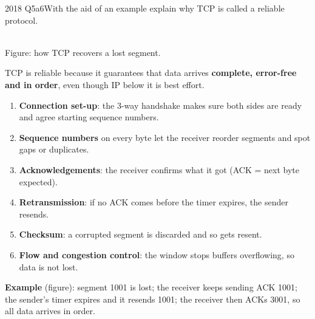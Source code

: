 \documentclass[10pt]{article}
\begin{document}
\begin{pastq}{2018 Q5a}{6}With the aid of an example explain why TCP is called a reliable protocol.\end{pastq}
\begin{center}
\\
{\scriptsize\color{midgrey}Figure: how TCP recovers a lost segment.}
\end{center}
\begin{ans}
TCP is reliable because it guarantees that data arrives \textbf{complete, error-free and in order}, even though IP below it is best effort.
\begin{enumerate}
\item \textbf{Connection set-up}: the 3-way handshake makes sure both sides are ready and agree starting sequence numbers.
\item \textbf{Sequence numbers} on every byte let the receiver reorder segments and spot gaps or duplicates.
\item \textbf{Acknowledgements}: the receiver confirms what it got (ACK = next byte expected).
\item \textbf{Retransmission}: if no ACK comes before the timer expires, the sender resends.
\item \textbf{Checksum}: a corrupted segment is discarded and so gets resent.
\item \textbf{Flow and congestion control}: the window stops buffers overflowing, so data is not lost.
\end{enumerate}
\textbf{Example} (figure): segment 1001 is lost; the receiver keeps sending ACK 1001; the sender's timer expires and it resends 1001; the receiver then ACKs 3001, so all data arrives in order.
\end{ans}
\end{document}
